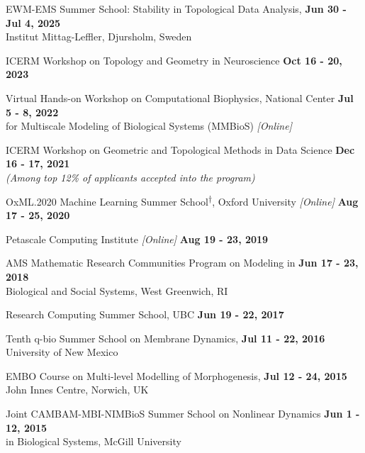\documentclass[margin,line]{res}
\newenvironment{list1}{
  \begin{list}{\ding{113}}{
      \setlength{\itemsep}{0in}
      \setlength{\parsep}{0in} \setlength{\parskip}{0in}
      \setlength{\topsep}{0in} \setlength{\partopsep}{0in}
      \setlength{\leftmargin}{0.17in}}}{\end{list}}
\begin{document}
\begin{resume}
\begin{list1}
\itemindent=-13pt
\setlength\itemsep{0.75em}
\item[] EWM-EMS Summer School: Stability in Topological Data Analysis, \hfill {\bf \small Jun 30 - Jul 4, 2025} \\
\hspace*{-1.5em} Institut Mittag-Leffler, Djursholm, Sweden 
\item[] ICERM Workshop on Topology and Geometry in Neuroscience \hfill {\bf \small Oct 16 - 20, 2023}
\item[] Virtual Hands-on Workshop on Computational Biophysics, National Center \hfill {\bf \small Jul 5 - 8, 2022} \\ 
\hspace*{-1.5em} for Multiscale Modeling of Biological Systems (MMBioS) \textit{[Online]} 
\item[] ICERM Workshop on Geometric and Topological Methods in Data Science \hfill {\bf \small Dec 16 - 17, 2021}\\
\hspace*{-1.8em} \textit{(Among top 12\% of applicants accepted into the program)}
\item[] OxML.2020 Machine Learning Summer School\textsuperscript{$\dagger$}, Oxford University \textit{[Online]} \hfill {\bf \small Aug 17 - 25, 2020}
\item[] Petascale Computing Institute \textit{[Online]} \hfill {\bf \small Aug 19 - 23, 2019}
\item[] AMS Mathematic Research Communities Program on Modeling in \hfill {\bf \small Jun 17 - 23, 2018} \\
\hspace*{-1.5em} Biological and Social Systems, West Greenwich, RI 
\item[] Research Computing Summer School, UBC \hfill {\bf \small Jun 19 - 22, 2017}
\item[] Tenth q-bio Summer School on Membrane Dynamics, \hfill {\bf \small Jul 11 - 22, 2016} \\
\hspace*{-1.5em} University of New Mexico
\item[] EMBO Course on Multi-level Modelling of Morphogenesis, \hfill {\bf \small Jul 12 - 24, 2015} \\ 
\hspace*{-1.5em} John Innes Centre, Norwich, UK 
\item[] Joint CAMBAM-MBI-NIMBioS Summer School on Nonlinear Dynamics \hfill {\bf \small Jun 1 - 12, 2015} \\ 
\hspace*{-1.5em} in Biological Systems, McGill University 
\end{list1}


\end{resume}
\end{document}
